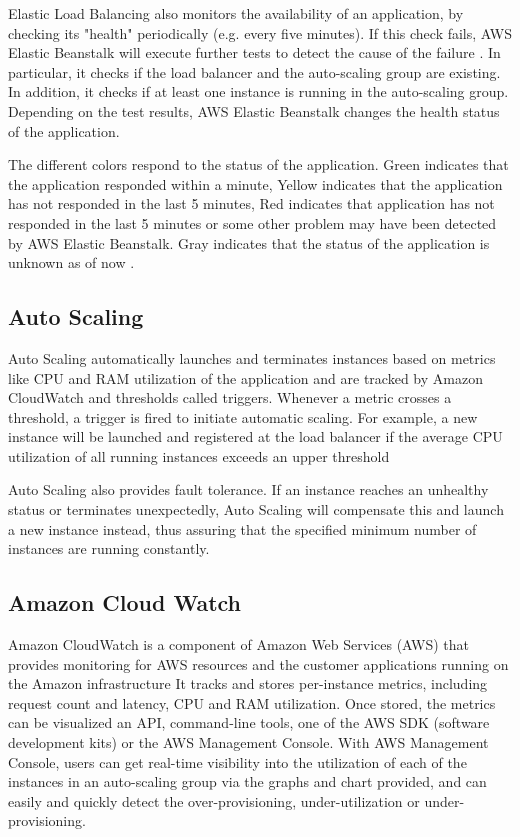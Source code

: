 \documentclass[9pt,twocolumn,twoside]{styles/osajnl}
\begin{document}
Elastic Load Balancing also monitors the availability of an
application, by checking its "health" periodically (e.g. every five
minutes). If this check fails, AWS Elastic Beanstalk will execute
further tests to detect the cause of the failure
\cite{elastic-loadbalancing}. In particular, it checks if the load
balancer and the auto-scaling group are existing.  In addition, it
checks if at least one instance is running in the auto-scaling
group. Depending on the test results, AWS Elastic Beanstalk changes
the health status of the application.
    
The different colors respond to the status of the application. Green
indicates that the application responded within a minute, Yellow
indicates that the application has not responded in the last 5
minutes, Red indicates that application has not responded in the last
5 minutes or some other problem may have been detected by AWS Elastic
Beanstalk. Gray indicates that the status of the application is
unknown as of now \cite{elastic-loadbalancing}.

\subsection{Auto Scaling}

Auto Scaling automatically launches and terminates instances based on
metrics like CPU and RAM utilization of the application and are
tracked by Amazon CloudWatch and thresholds called triggers. Whenever
a metric crosses a threshold, a trigger is fired to initiate automatic
scaling.  For example, a new instance will be launched and registered
at the load balancer if the average CPU utilization of all running
instances exceeds an upper threshold
    
Auto Scaling also provides fault tolerance. If an instance reaches an
unhealthy status or terminates unexpectedly, Auto Scaling will
compensate this and launch a new instance instead, thus assuring that
the specified minimum number of instances are running constantly.

\subsection{Amazon Cloud Watch}

Amazon CloudWatch is a component of Amazon Web Services (AWS) that
provides monitoring for AWS resources and the customer applications
running on the Amazon infrastructure \cite{elastic-cloudwatch}  It tracks and stores
per-instance metrics, including request count and latency, CPU and RAM
utilization.  Once stored, the metrics can be visualized an API,
command-line tools, one of the AWS SDK (software development kits) or
the AWS Management Console. With AWS Management Console, users can
get real-time visibility into the utilization of each of the instances
in an auto-scaling group via the graphs and chart provided, and can
easily and quickly detect the over-provisioning, under-utilization or
under-provisioning.
\end{document}
